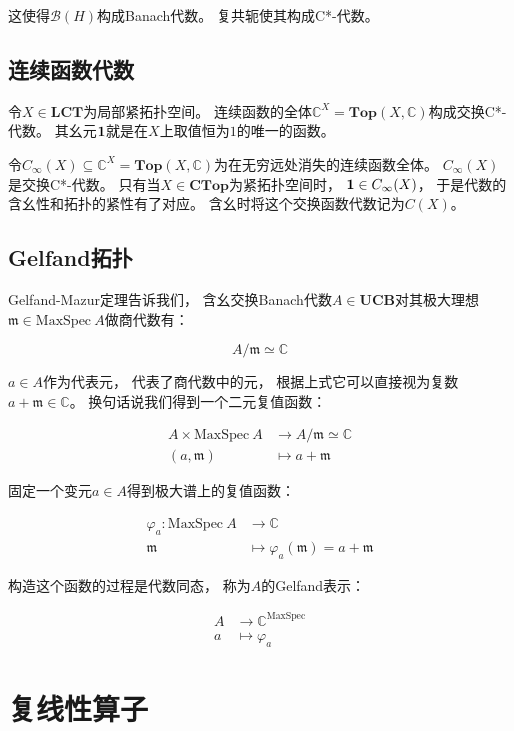 \documentclass[10pt, openany]{book}
\begin{document}
这使得$\mathcal B(H)$构成Banach代数。
复共轭使其构成C*-代数。

\section{连续函数代数}

令$X\in\textbf{LCT}$为局部紧拓扑空间。
连续函数的全体$\mathbb C^X = \textbf{Top}(X,\mathbb C)$构成交换C*-代数。
其幺元$\textbf 1$就是在$X$上取值恒为$1$的唯一的函数。

令$C_\infty(X) \subseteq \mathbb C^X = \textbf{Top}(X,\mathbb C)$为在无穷远处消失的连续函数全体。
$C_\infty(X)$是交换C*-代数。
只有当$X\in\textbf{CTop}$为紧拓扑空间时，
$\textbf 1 \in C_\infty(X)$，
于是代数的含幺性和拓扑的紧性有了对应。
含幺时将这个交换函数代数记为$C(X)$。

\section{Gelfand拓扑}

Gelfand-Mazur定理告诉我们，
含幺交换Banach代数$A \in \textbf{UCB}$对其极大理想$\mathfrak m\in\text{MaxSpec} \ A$做商代数有：

$$
A/\mathfrak m \simeq \mathbb C
$$

$a \in A$作为代表元，
代表了商代数中的元，
根据上式它可以直接视为复数
$a + \mathfrak m \in \mathbb C$。
换句话说我们得到一个二元复值函数：

$$
\begin{aligned}
A \times \text{MaxSpec} \ A &\to A/\mathfrak m \simeq \mathbb C \\
(a,\mathfrak m) &\mapsto a + \mathfrak m 
\end{aligned}
$$

固定一个变元$a \in A$得到极大谱上的复值函数：

$$
\begin{aligned}
\varphi_a: \text{MaxSpec} \ A &\to \mathbb C \\
\mathfrak m &\mapsto \varphi_a(\mathfrak m) = a + \mathfrak m 
\end{aligned}
$$

构造这个函数的过程是代数同态，
称为$A$的Gelfand表示：

$$
\begin{aligned}
A &\to \mathbb C^{\text{MaxSpec}} \\
a &\mapsto \varphi_a 
\end{aligned}
$$



\chapter{复线性算子}
\end{document}

